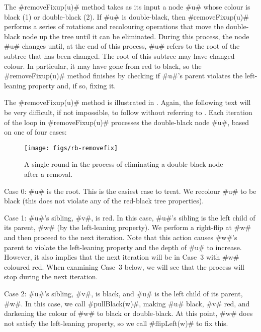 The #removeFixup(u)# method takes as its input a node #u# whose colour is black
(1) or double-black (2).  If #u# is double-black, then #removeFixup(u)#
performs a series of rotations and recolouring operations that move the
double-black node up the tree until it can be eliminated.  During this
process, the node #u# changes until, at the end of this process, #u#
refers to the root of the subtree that has been changed.  The root of
this subtree may have changed colour.  In particular, it may have gone
from red to black, so the #removeFixup(u)# method finishes by checking
if #u#'s parent violates the left-leaning property and, if so, fixing it.

The #removeFixup(u)# method is illustrated in .
Again, the following text will be very difficult, if not impossible,
to follow without referring to .
Each iteration of the loop in #removeFixup(u)# processes the double-black
node #u#, based on one of four cases:

\begin{figure}
  \begin{center}
    \texttt{[image: figs/rb-removefix]}
  \end{center}
  \caption{A single round in the process of eliminating a double-black node
   after a removal.}
\end{figure}

\noindent
Case 0: #u# is the root.  This is the easiest case to treat.  We recolour
#u# to be black (this does not violate any of the red-black tree
properties).

\noindent 
Case 1: #u#'s sibling, #v#, is red.  In this case, #u#'s sibling is the
left child of its parent, #w# (by the left-leaning property).  We perform
a right-flip at #w# and then proceed to the next iteration.  Note that
this action causes #w#'s parent to violate the left-leaning property and
the depth of #u# to increase.  However, it also implies that the next
iteration will be in Case~3 with #w# coloured red.  When examining Case~3
below, we will see that the process will stop during the next iteration.

\noindent
Case 2: #u#'s sibling, #v#, is black, and #u# is the left child of its
parent, #w#.  In this case, we call #pullBlack(w)#, making #u# black,
#v# red, and darkening the colour of #w# to black or double-black.
At this point, #w# does not satisfy the left-leaning property, so we
call #flipLeft(w)# to fix this.

